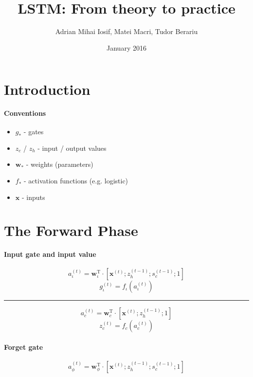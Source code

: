 \documentclass[11pt]{article}
\title{LSTM: From theory to practice}
\author{Adrian Mihai Iosif, Matei Macri, Tudor Berariu}
\date{January 2016}
\begin{document}
\maketitle

\section{Introduction}

\paragraph{Conventions}
\begin{itemize}
    \item $g_{*}$ - gates
    \item $z_{c}$ / $z_h$ - input / output values
    \item $\mathbf{w}_{*}$ - weights (parameters)
    \item $f_{*}$ - activation functions (e.g. logistic)
    \item $\mathbf{x}$ - inputs
\end{itemize}

\section{The Forward Phase}

\paragraph{Input gate and input value}

$$a_{\iota}^{(t)} = \mathbf{w}_{\iota}^{\text{T}} \cdot \left[\mathbf{x}^{(t)}; z_{h}^{(t-1)}; s_c^{(t-1)}; 1\right]$$
$$g_{\iota}^{(t)} = f_{\iota}\left(a_{\iota}^{(t)}\right)$$

\begin{center}\rule[0.5ex]{.3\linewidth}{1pt}\end{center}

$$a_{c}^{(t)} = \mathbf{w}_{c}^{\text{T}} \cdot \left[\mathbf{x}^{(t)}; z_{h}^{(t-1)}; 1\right]$$
$$z_{c}^{(t)} = f_{c}\left(a_{c}^{(t)}\right)$$

\paragraph{Forget gate}

$$a_{\phi}^{(t)} = \mathbf{w}_{\phi}^{\text{T}} \cdot \left[\mathbf{x}^{(t)}; z_{h}^{(t-1)}; s_c^{(t-1)}; 1\right]$$
\end{document}
